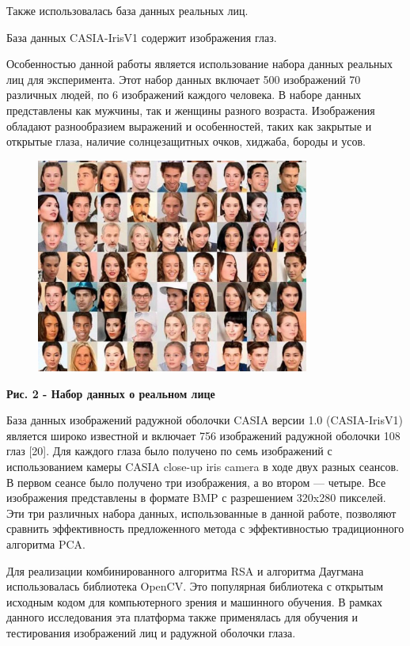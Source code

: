 Также использовалась база данных реальных лиц.

База данных CASIA-IrisV1 содержит изображения глаз.

Особенностью данной работы является использование набора данных реальных
лиц для эксперимента. Этот набор данных включает 500 изображений 70
различных людей, по 6 изображений каждого человека. В наборе данных
представлены как мужчины, так и женщины разного возраста. Изображения
обладают разнообразием выражений и особенностей, таких как закрытые и
открытые глаза, наличие солнцезащитных очков, хиджаба, бороды и усов.

\begin{figure}[H]
	\centering
	\includegraphics[width=0.8\textwidth]{assets/84}
	\caption*{}
\end{figure}

\textbf{Рис. 2 - Набор данных о реальном лице}

База данных изображений радужной оболочки CASIA версии 1.0
(CASIA-IrisV1) является широко известной и включает 756 изображений
радужной оболочки 108 глаз {[}20{]}. Для каждого глаза было получено по
семь изображений с использованием камеры CASIA close-up iris camera в
ходе двух разных сеансов. В первом сеансе было получено три изображения,
а во втором --- четыре. Все изображения представлены в формате BMP с
разрешением 320x280 пикселей. Эти три различных набора данных,
использованные в данной работе, позволяют сравнить эффективность
предложенного метода с эффективностью традиционного алгоритма PCA.

Для реализации комбинированного алгоритма RSA и алгоритма Даугмана
использовалась библиотека OpenCV. Это популярная библиотека с открытым
исходным кодом для компьютерного зрения и машинного обучения. В рамках
данного исследования эта платформа также применялась для обучения и
тестирования изображений лиц и радужной оболочки глаза.

